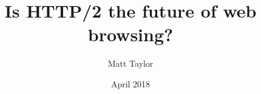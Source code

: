 \documentclass{article}
\title{Is HTTP/2 the future of web browsing?}
\author{Matt Taylor}
\date{April 2018}
\begin{document}
\maketitle



\tableofcontents

















\pagebreak

\printbibliography{}
\end{document}
